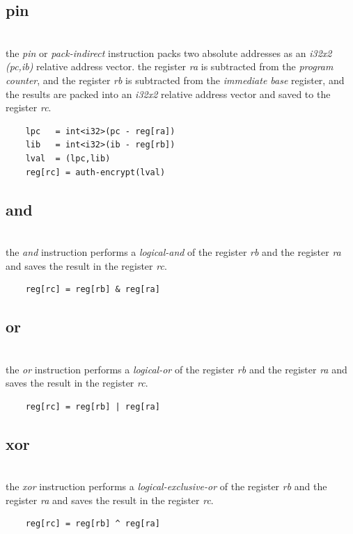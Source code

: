 \subsection{pin}
\\
the \emph{pin} or \emph{pack-indirect} instruction packs two absolute
addresses as an \emph{i32x2} \emph{(pc,ib)} relative address vector.
the register \emph{ra} is subtracted from the \emph{program counter},
and the register \emph{rb} is subtracted from the \emph{immediate base}
register, and the results are packed into an \emph{i32x2} relative address
vector and saved to the register \emph{rc}.
\begin{Verbatim}
    lpc   = int<i32>(pc - reg[ra])
    lib   = int<i32>(ib - reg[rb])
    lval  = (lpc,lib)
    reg[rc] = auth-encrypt(lval)
\end{Verbatim}

\subsection{and}
\\
the \emph{and} instruction performs a \emph{logical-and} of the register
\emph{rb} and the register \emph{ra} and saves the result in the
register \emph{rc}.
\begin{Verbatim}
    reg[rc] = reg[rb] & reg[ra]
\end{Verbatim}

\subsection{or}
\\
the \emph{or} instruction performs a \emph{logical-or} of the register
\emph{rb} and the register \emph{ra} and saves the result in the
register \emph{rc}.
\begin{Verbatim}
    reg[rc] = reg[rb] | reg[ra]
\end{Verbatim}

\subsection{xor}
\\
the \emph{xor} instruction performs a \emph{logical-exclusive-or}
of the register \emph{rb} and the register \emph{ra} and saves the
result in the register \emph{rc}.
\begin{Verbatim}
    reg[rc] = reg[rb] ^ reg[ra]
\end{Verbatim}

